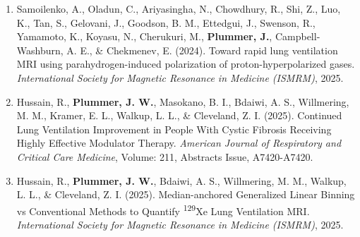 \documentclass[12pt,]{scrartcl}
\begin{document}
\begin{enumerate}
  \leftskip-0.13in %







    \item Samoilenko, A., Oladun, C., Ariyasingha, N., Chowdhury, R., Shi, Z., Luo, K., Tan, S., Gelovani, J., Goodson, B. M., Ettedgui, J., Swenson, R., Yamamoto, K., Koyasu, N., Cherukuri, M., \textbf{Plummer, J.}, Campbell-Washburn, A. E., \& Chekmenev, E. (2024). Toward rapid lung ventilation MRI using parahydrogen-induced polarization of proton-hyperpolarized gases. \textit{International Society for Magnetic Resonance in Medicine (ISMRM)}, 2025.

    \item Hussain, R., \textbf{Plummer, J. W.}, Masokano, B. I., Bdaiwi, A. S., Willmering, M. M., Kramer, E. L., Walkup, L. L., \& Cleveland, Z. I. (2025). Continued Lung Ventilation Improvement in People With Cystic Fibrosis Receiving Highly Effective Modulator Therapy. \textit{American Journal of Respiratory and Critical Care Medicine}, Volume: 211, Abstracts Issue, A7420-A7420.

    \item Hussain, R., \textbf{Plummer, J. W.}, Bdaiwi, A. S., Willmering, M. M., Walkup, L. L., \& Cleveland, Z. I. (2025). Median-anchored Generalized Linear Binning vs Conventional Methods to Quantify \textsuperscript{129}Xe Lung Ventilation MRI. \textit{International Society for Magnetic Resonance in Medicine (ISMRM)}, 2025.


\end{enumerate}
\end{document}
